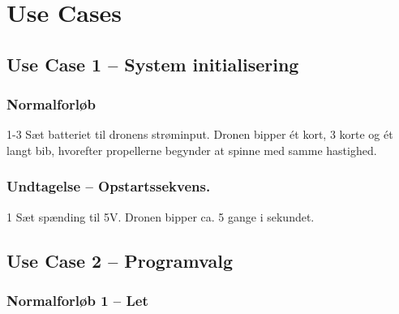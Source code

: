 \documentclass[Main]{subfiles}
\begin{document}
\chapter{Use Cases}

\section{Use Case 1 -- System initialisering}

\subsection*{Normalforløb}
\begin{TestCaseIntro}
\end{TestCaseIntro}

\begin{TestCase}
\TC
{1-3}
{Sæt batteriet til dronens strøminput.}
{Dronen bipper ét kort, 3 korte og ét langt bib, hvorefter propellerne begynder at spinne med samme hastighed.}
{}
\end{TestCase}





\subsection*{Undtagelse -- Opstartssekvens.}

\begin{TestCaseIntro}
\end{TestCaseIntro}

\begin{TestCase}
\TC
{1}
{Sæt spænding til 5V.}
{Dronen bipper ca. 5 gange i sekundet.}
{}
\end{TestCase}






\newpage
\section{Use Case 2 -- Programvalg}

\subsection*{Normalforløb 1 -- Let}
\begin{TestCaseIntro}
\end{TestCaseIntro}
\end{document}
